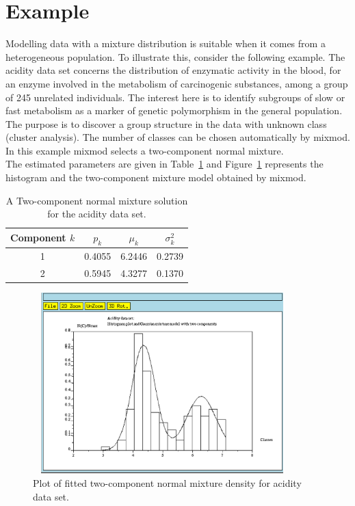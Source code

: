 \section{Example}
Modelling data with a mixture distribution is suitable when it comes from a
heterogeneous population. To illustrate this, consider the following
example. The acidity data set concerns the distribution of enzymatic
activity in the blood, for an enzyme involved in the metabolism of
carcinogenic substances, among a group of 245 unrelated
individuals. The interest here is to identify subgroups of slow or
fast metabolism as a marker of genetic polymorphism in the general
population. The purpose is to discover a group structure in the data with unknown class (cluster analysis). The number
of classes can be chosen automatically by {\sc mixmod}. In this
example {\sc mixmod} selects a two-component normal mixture. \\
The estimated parameters are given in Table~\ref{tableIntro} and Figure~\ref{figIntro} represents the histogram and the two-component mixture model obtained by {\sc mixmod}.

\begin{table}[!h]
  \begin{center}
    \begin{tabular}{cccc}
      \hline
      Component $k$ & $p_k$   & $\mu_k$ & $\sigma_k^2$ \\
      \hline
      1             & 0.4055  & 6.2446  & 0.2739 \\
      2             & 0.5945  & 4.3277  & 0.1370 \\
      \hline
    \end{tabular}
    \caption{A Two-component normal mixture solution for the acidity data set.}\label{tableIntro}
  \end{center}
\end{table}

\newpage

\begin{figure}[!h]
  \centering
  \includegraphics[width=10cm, height=7cm]{acidity.eps}
  \caption{Plot of fitted two-component normal mixture density for acidity data set.}\label{figIntro}
\end{figure}

